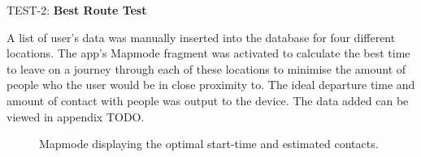 TEST-2: \textbf{Best Route Test}

A list of user’s data was manually inserted into the database for four different locations. The app’s Mapmode fragment was activated to calculate the best time to leave on a journey through each of these locations to minimise the amount of people who the user would be in close proximity to. The ideal departure time and amount of contact with people was output to the device. The data added can be viewed in appendix TODO.

\begin{figure}[ht]
    \centering
    \caption{Mapmode displaying the optimal start-time and estimated contacts.}
    \label{fig:result_mapmode}
\end{figure}

